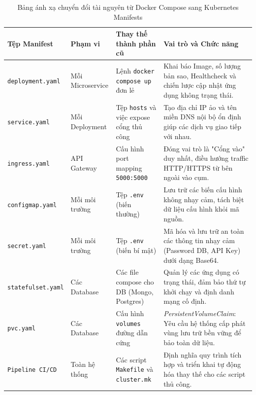\begin{table}[H]
    \centering
    \small %
    \caption{Bảng ánh xạ chuyển đổi tài nguyên từ Docker Compose sang Kubernetes Manifests}
    \label{tab:k8s-migration-map}
    \begin{tabularx}{\textwidth}{|l|l|X|X|}
    \hline
    \textbf{Tệp Manifest} & \textbf{Phạm vi} & \textbf{Thay thế thành phần cũ} & \textbf{Vai trò và Chức năng} \\ \hline
    
    \texttt{deployment.yaml} & Mỗi Microservice & Lệnh \texttt{docker compose up} đơn lẻ & Khai báo Image, số lượng bản sao, Healthcheck và chiến lược cập nhật ứng dụng không trạng thái. \\ \hline
    
    \texttt{service.yaml} & Mỗi Deployment & Tệp \texttt{hosts} và việc expose cổng thủ công & Tạo địa chỉ IP ảo và tên miền DNS nội bộ ổn định giúp các dịch vụ giao tiếp với nhau. \\ \hline
    
    \texttt{ingress.yaml} & API Gateway & Cấu hình port mapping \texttt{5000:5000} & Đóng vai trò là "Cổng vào" duy nhất, điều hướng traffic HTTP/HTTPS từ bên ngoài vào cụm. \\ \hline
    
    \texttt{configmap.yaml} & Mỗi môi trường & Tệp \texttt{.env} (biến thường) & Lưu trữ các biến cấu hình không nhạy cảm, tách biệt dữ liệu cấu hình khỏi mã nguồn. \\ \hline
    
    \texttt{secret.yaml} & Mỗi môi trường & Tệp \texttt{.env} (biến bí mật) & Mã hóa và lưu trữ an toàn các thông tin nhạy cảm (Password DB, API Key) dưới dạng Base64. \\ \hline
    
    \texttt{statefulset.yaml} & Các Database & Các file compose cho DB (Mongo, Postgres) & Quản lý các ứng dụng có trạng thái, đảm bảo thứ tự khởi chạy và định danh mạng cố định. \\ \hline
    
    \texttt{pvc.yaml} & Các Database & Cấu hình \texttt{volumes} đường dẫn cứng & \textit{PersistentVolumeClaim}: Yêu cầu hệ thống cấp phát vùng lưu trữ bền vững để bảo toàn dữ liệu. \\ \hline
    
    \texttt{Pipeline CI/CD} & Toàn hệ thống & Các script \texttt{Makefile} và \texttt{cluster.mk} & Định nghĩa quy trình tích hợp và triển khai tự động hóa thay thế cho các script thủ công. \\ \hline
    \end{tabularx}
\end{table}


